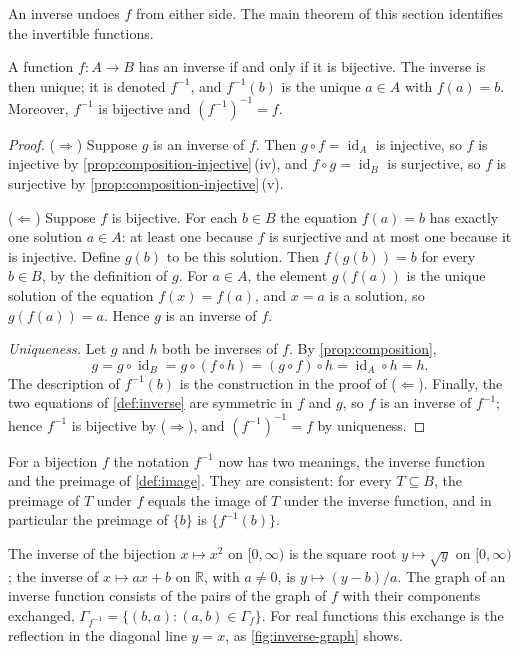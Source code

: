 An inverse undoes $f$ from either side. The main theorem of this section identifies the invertible functions.

\begin{theorem}
\label{thm:inverse}
A function $f\colon A\to B$ has an inverse if and only if it is bijective. The inverse is then unique; it is denoted $f^{-1}$, and $f^{-1}(b)$ is the unique $a\in A$ with $f(a)=b$. Moreover, $f^{-1}$ is bijective and $(f^{-1})^{-1}=f$.
\end{theorem}

\begin{proof}
($\Rightarrow$) Suppose $g$ is an inverse of $f$. Then $g\circ f=\operatorname{id}_A$ is injective, so $f$ is injective by \cref{prop:composition-injective}\,(iv), and $f\circ g=\operatorname{id}_B$ is surjective, so $f$ is surjective by \cref{prop:composition-injective}\,(v).

($\Leftarrow$) Suppose $f$ is bijective. For each $b\in B$ the equation $f(a)=b$ has exactly one solution $a\in A$: at least one because $f$ is surjective and at most one because it is injective. Define $g(b)$ to be this solution. Then $f(g(b))=b$ for every $b\in B$, by the definition of $g$. For $a\in A$, the element $g(f(a))$ is the unique solution of the equation $f(x)=f(a)$, and $x=a$ is a solution, so $g(f(a))=a$. Hence $g$ is an inverse of $f$.

\emph{Uniqueness.} Let $g$ and $h$ both be inverses of $f$. By \cref{prop:composition},
\[
g=g\circ\operatorname{id}_B=g\circ(f\circ h)=(g\circ f)\circ h=\operatorname{id}_A\circ h=h .
\]
The description of $f^{-1}(b)$ is the construction in the proof of ($\Leftarrow$). Finally, the two equations of \cref{def:inverse} are symmetric in $f$ and $g$, so $f$ is an inverse of $f^{-1}$; hence $f^{-1}$ is bijective by ($\Rightarrow$), and $(f^{-1})^{-1}=f$ by uniqueness.
\end{proof}

For a bijection $f$ the notation $f^{-1}$ now has two meanings, the inverse function and the preimage of \cref{def:image}. They are consistent: for every $T\subseteq B$, the preimage of $T$ under $f$ equals the image of $T$ under the inverse function, and in particular the preimage of $\{b\}$ is $\{f^{-1}(b)\}$.

The inverse of the bijection $x\mapsto x^2$ on $[0,\infty)$ is the square root $y\mapsto\sqrt y$ on $[0,\infty)$; the inverse of $x\mapsto ax+b$ on $\mathbb R$, with $a\ne0$, is $y\mapsto(y-b)/a$. The graph of an inverse function consists of the pairs of the graph of $f$ with their components exchanged, $\Gamma_{f^{-1}}=\{(b,a): (a,b)\in\Gamma_f\}$. For real functions this exchange is the reflection in the diagonal line $y=x$, as \cref{fig:inverse-graph} shows.

